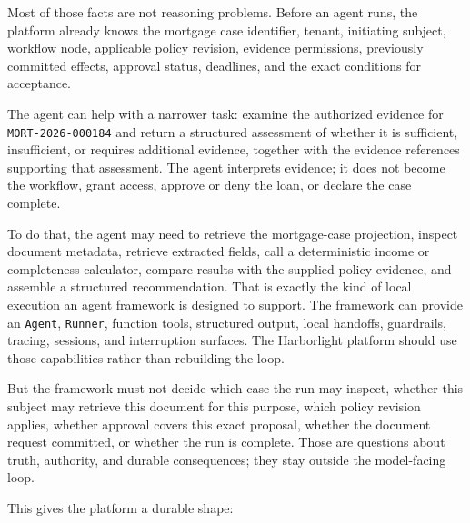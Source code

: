 Most of those facts are not reasoning problems. Before an agent runs, the platform already knows the mortgage case identifier, tenant, initiating subject, workflow node, applicable policy revision, evidence permissions, previously committed effects, approval status, deadlines, and the exact conditions for acceptance.\par

The agent can help with a narrower task: examine the authorized evidence for \lstinline[style=bookinline]!MORT-2026-000184! and return a structured assessment of whether it is sufficient, insufficient, or requires additional evidence, together with the evidence references supporting that assessment. The agent interprets evidence; it does not become the workflow, grant access, approve or deny the loan, or declare the case complete.\par

To do that, the agent may need to retrieve the mortgage-case projection, inspect document metadata, retrieve extracted fields, call a deterministic income or completeness calculator, compare results with the supplied policy evidence, and assemble a structured recommendation. That is exactly the kind of local execution an agent framework is designed to support. The framework can provide an \lstinline[style=bookinline]!Agent!, \lstinline[style=bookinline]!Runner!, function tools, structured output, local handoffs, guardrails, tracing, sessions, and interruption surfaces.  The Harborlight platform should use those capabilities rather than rebuilding the loop.\par

But the framework must not decide which case the run may inspect, whether this subject may retrieve this document for this purpose, which policy revision applies, whether approval covers this exact proposal, whether the document request committed, or whether the run is complete. Those are questions about truth, authority, and durable consequences; they stay outside the model-facing loop.\par

This gives the platform a durable shape:\par

